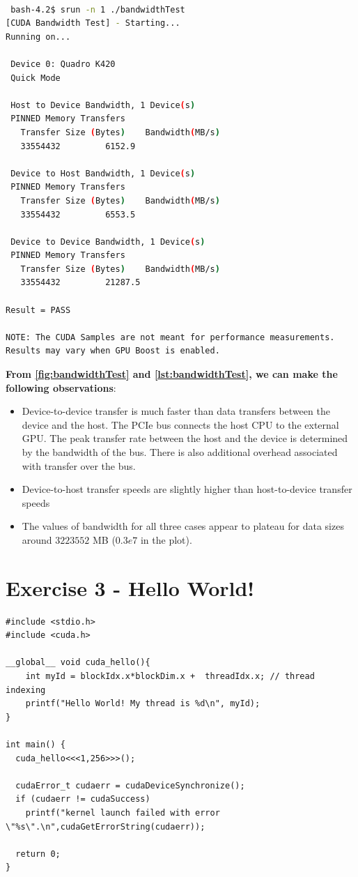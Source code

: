 \documentclass[12pt]{article}
\begin{document}
\begin{lstlisting}[language=bash, label={lst:bandwidthTest}, caption={bandwidthTest on Tegner}, captionpos=b]

 bash-4.2$ srun -n 1 ./bandwidthTest
[CUDA Bandwidth Test] - Starting...
Running on...

 Device 0: Quadro K420
 Quick Mode

 Host to Device Bandwidth, 1 Device(s)
 PINNED Memory Transfers
   Transfer Size (Bytes)	Bandwidth(MB/s)
   33554432			6152.9

 Device to Host Bandwidth, 1 Device(s)
 PINNED Memory Transfers
   Transfer Size (Bytes)	Bandwidth(MB/s)
   33554432			6553.5

 Device to Device Bandwidth, 1 Device(s)
 PINNED Memory Transfers
   Transfer Size (Bytes)	Bandwidth(MB/s)
   33554432			21287.5

Result = PASS

NOTE: The CUDA Samples are not meant for performance measurements.
Results may vary when GPU Boost is enabled.
\end{lstlisting}

\textbf{From \autoref{fig:bandwidthTest} and \autoref{lst:bandwidthTest}, we can make the following observations}:
\begin{itemize}
    \item Device-to-device transfer is much faster than data transfers between the device and the host. The PCIe bus connects the host CPU to the external GPU. The peak transfer rate between the host and the device is determined by the bandwidth of the bus. There is also additional overhead associated with transfer over the bus.
    \item Device-to-host transfer speeds are slightly higher than host-to-device transfer speeds
    \item The values of bandwidth for all three cases appear to plateau for data sizes around $3223552$ MB ($0.3e7$ in the plot).
\end{itemize}

\section{Exercise 3 - Hello World!}

\begin{lstlisting}[style=CStyle]
#include <stdio.h>
#include <cuda.h>

__global__ void cuda_hello(){
    int myId = blockIdx.x*blockDim.x +  threadIdx.x; // thread indexing
    printf("Hello World! My thread is %d\n", myId);
}

int main() {
  cuda_hello<<<1,256>>>();

  cudaError_t cudaerr = cudaDeviceSynchronize();
  if (cudaerr != cudaSuccess)
    printf("kernel launch failed with error \"%s\".\n",cudaGetErrorString(cudaerr));

  return 0;
}
    \end{lstlisting}
    
\end{document}
